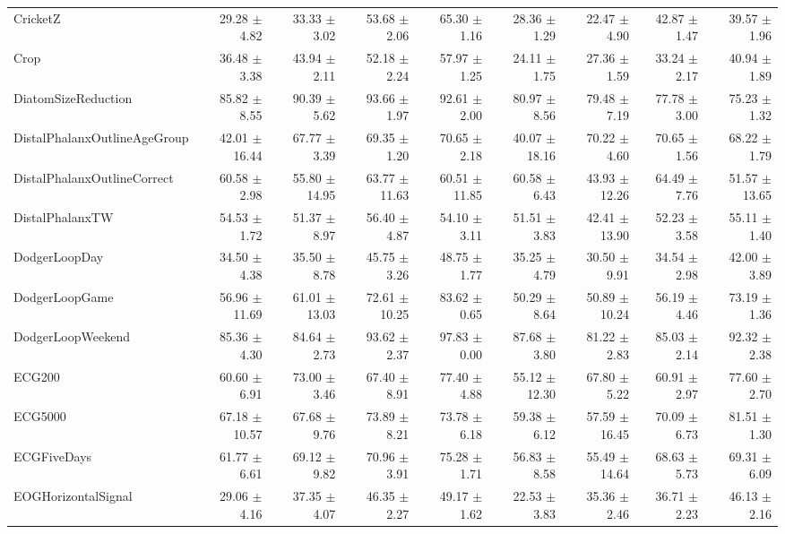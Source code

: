 \begin{landscape}
\begin{longtable}{lrrrrrrrr}
CricketZ & 29.28 $\pm$ 4.82 & 33.33 $\pm$ 3.02 & 53.68 $\pm$ 2.06 & 65.30 $\pm$ 1.16 & 28.36 $\pm$ 1.29 & 22.47 $\pm$ 4.90 & 42.87 $\pm$ 1.47 & 39.57 $\pm$ 1.96 \\
Crop & 36.48 $\pm$ 3.38 & 43.94 $\pm$ 2.11 & 52.18 $\pm$ 2.24 & 57.97 $\pm$ 1.25 & 24.11 $\pm$ 1.75 & 27.36 $\pm$ 1.59 & 33.24 $\pm$ 2.17 & 40.94 $\pm$ 1.89 \\
DiatomSizeReduction & 85.82 $\pm$ 8.55 & 90.39 $\pm$ 5.62 & 93.66 $\pm$ 1.97 & 92.61 $\pm$ 2.00 & 80.97 $\pm$ 8.56 & 79.48 $\pm$ 7.19 & 77.78 $\pm$ 3.00 & 75.23 $\pm$ 1.32 \\
DistalPhalanxOutlineAgeGroup & 42.01 $\pm$ 16.44 & 67.77 $\pm$ 3.39 & 69.35 $\pm$ 1.20 & 70.65 $\pm$ 2.18 & 40.07 $\pm$ 18.16 & 70.22 $\pm$ 4.60 & 70.65 $\pm$ 1.56 & 68.22 $\pm$ 1.79 \\
DistalPhalanxOutlineCorrect & 60.58 $\pm$ 2.98 & 55.80 $\pm$ 14.95 & 63.77 $\pm$ 11.63 & 60.51 $\pm$ 11.85 & 60.58 $\pm$ 6.43 & 43.93 $\pm$ 12.26 & 64.49 $\pm$ 7.76 & 51.57 $\pm$ 13.65 \\
DistalPhalanxTW & 54.53 $\pm$ 1.72 & 51.37 $\pm$ 8.97 & 56.40 $\pm$ 4.87 & 54.10 $\pm$ 3.11 & 51.51 $\pm$ 3.83 & 42.41 $\pm$ 13.90 & 52.23 $\pm$ 3.58 & 55.11 $\pm$ 1.40 \\
DodgerLoopDay & 34.50 $\pm$ 4.38 & 35.50 $\pm$ 8.78 & 45.75 $\pm$ 3.26 & 48.75 $\pm$ 1.77 & 35.25 $\pm$ 4.79 & 30.50 $\pm$ 9.91 & 34.54 $\pm$ 2.98 & 42.00 $\pm$ 3.89 \\
DodgerLoopGame & 56.96 $\pm$ 11.69 & 61.01 $\pm$ 13.03 & 72.61 $\pm$ 10.25 & 83.62 $\pm$ 0.65 & 50.29 $\pm$ 8.64 & 50.89 $\pm$ 10.24 & 56.19 $\pm$ 4.46 & 73.19 $\pm$ 1.36 \\
DodgerLoopWeekend & 85.36 $\pm$ 4.30 & 84.64 $\pm$ 2.73 & 93.62 $\pm$ 2.37 & 97.83 $\pm$ 0.00 & 87.68 $\pm$ 3.80 & 81.22 $\pm$ 2.83 & 85.03 $\pm$ 2.14 & 92.32 $\pm$ 2.38 \\
ECG200 & 60.60 $\pm$ 6.91 & 73.00 $\pm$ 3.46 & 67.40 $\pm$ 8.91 & 77.40 $\pm$ 4.88 & 55.12 $\pm$ 12.30 & 67.80 $\pm$ 5.22 & 60.91 $\pm$ 2.97 & 77.60 $\pm$ 2.70 \\
ECG5000 & 67.18 $\pm$ 10.57 & 67.68 $\pm$ 9.76 & 73.89 $\pm$ 8.21 & 73.78 $\pm$ 6.18 & 59.38 $\pm$ 6.12 & 57.59 $\pm$ 16.45 & 70.09 $\pm$ 6.73 & 81.51 $\pm$ 1.30 \\
ECGFiveDays & 61.77 $\pm$ 6.61 & 69.12 $\pm$ 9.82 & 70.96 $\pm$ 3.91 & 75.28 $\pm$ 1.71 & 56.83 $\pm$ 8.58 & 55.49 $\pm$ 14.64 & 68.63 $\pm$ 5.73 & 69.31 $\pm$ 6.09 \\
EOGHorizontalSignal & 29.06 $\pm$ 4.16 & 37.35 $\pm$ 4.07 & 46.35 $\pm$ 2.27 & 49.17 $\pm$ 1.62 & 22.53 $\pm$ 3.83 & 35.36 $\pm$ 2.46 & 36.71 $\pm$ 2.23 & 46.13 $\pm$ 2.16 \\

\end{longtable}
\end{landscape}
